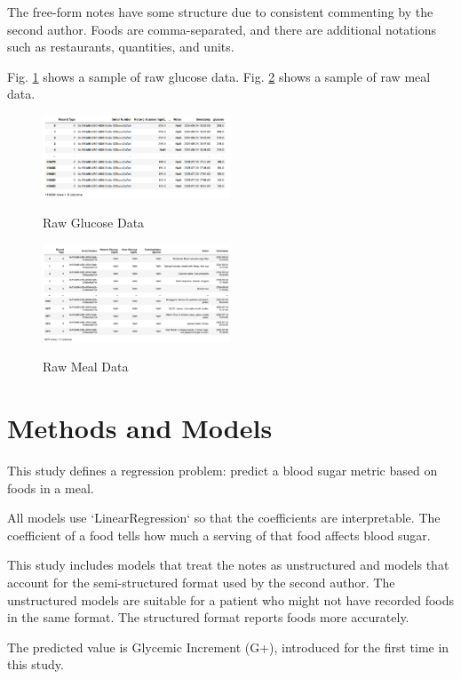 \documentclass[conference]{IEEEtran}
\begin{document}
The free-form notes have some structure due to consistent commenting by the second author. Foods are comma-separated, and there are additional notations such as restaurants, quantities, and units.

Fig. \ref{fig:glucose_data} shows a sample of raw glucose data.  Fig. \ref{fig:meal_data} shows a sample of raw meal data.

\begin{figure}[tbp]
    \includegraphics[width=0.5\textwidth]{images/glucose_data.png}
    \label{fig:glucose_data}
    \caption{Raw Glucose Data}
\end{figure}

\begin{figure}[htbp]
    \includegraphics[width=0.5\textwidth]{images/meal_data.png}
    \label{fig:meal_data}
    \caption{Raw Meal Data}
\end{figure}

\section{Methods and Models}

This study defines a regression problem: predict a blood sugar metric based on foods in a meal.

All models use `LinearRegression` so that the coefficients are interpretable. The coefficient of a food tells how much a serving of that food affects blood sugar.

This study includes models that treat the notes as unstructured and models that account for the semi-structured format used by the second author. The unstructured models are suitable for a patient who might not have recorded foods in the same format. The structured format reports foods more accurately.

The predicted value is Glycemic Increment (G+), introduced for the first time in this study.
\end{document}
